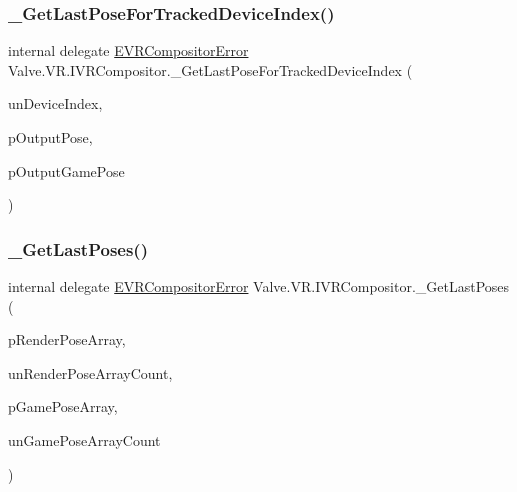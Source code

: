 \mbox{\label{struct_valve_1_1_v_r_1_1_i_v_r_compositor_a707d9c738e4eb3162086a2b14bca3c70}} 
\subsubsection{\texorpdfstring{\_GetLastPoseForTrackedDeviceIndex()}{\_GetLastPoseForTrackedDeviceIndex()}}
{\footnotesize\ttfamily internal delegate \mbox{\hyperlink{namespace_valve_1_1_v_r_ac34ee1034fda668ccd45f57676ded81b}{E\+V\+R\+Compositor\+Error}} Valve.\+V\+R.\+I\+V\+R\+Compositor.\+\_\+\+Get\+Last\+Pose\+For\+Tracked\+Device\+Index (\begin{DoxyParamCaption}\item[{uint}]{un\+Device\+Index,  }\item[{ref \mbox{\hyperlink{struct_valve_1_1_v_r_1_1_tracked_device_pose__t}{Tracked\+Device\+Pose\+\_\+t}}}]{p\+Output\+Pose,  }\item[{ref \mbox{\hyperlink{struct_valve_1_1_v_r_1_1_tracked_device_pose__t}{Tracked\+Device\+Pose\+\_\+t}}}]{p\+Output\+Game\+Pose }\end{DoxyParamCaption})}

\mbox{\label{struct_valve_1_1_v_r_1_1_i_v_r_compositor_ab8dca04ae79b8aa27b29fb0a87260240}} 
\subsubsection{\texorpdfstring{\_GetLastPoses()}{\_GetLastPoses()}}
{\footnotesize\ttfamily internal delegate \mbox{\hyperlink{namespace_valve_1_1_v_r_ac34ee1034fda668ccd45f57676ded81b}{E\+V\+R\+Compositor\+Error}} Valve.\+V\+R.\+I\+V\+R\+Compositor.\+\_\+\+Get\+Last\+Poses (\begin{DoxyParamCaption}\item[{\mbox{[}\+In, Out\mbox{]} \mbox{\hyperlink{struct_valve_1_1_v_r_1_1_tracked_device_pose__t}{Tracked\+Device\+Pose\+\_\+t}} \mbox{[}$\,$\mbox{]}}]{p\+Render\+Pose\+Array,  }\item[{uint}]{un\+Render\+Pose\+Array\+Count,  }\item[{\mbox{[}\+In, Out\mbox{]} \mbox{\hyperlink{struct_valve_1_1_v_r_1_1_tracked_device_pose__t}{Tracked\+Device\+Pose\+\_\+t}} \mbox{[}$\,$\mbox{]}}]{p\+Game\+Pose\+Array,  }\item[{uint}]{un\+Game\+Pose\+Array\+Count }\end{DoxyParamCaption})}


